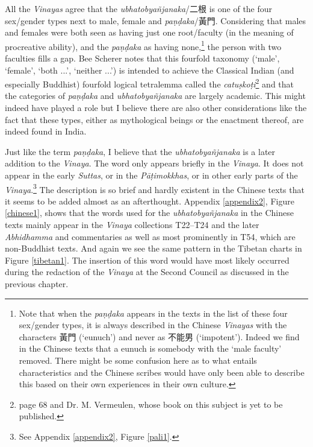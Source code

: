 All the \textit{Vinayas} agree that the \textit{ubhatob­yañ­janaka}/二根 is one of the four sex/gender types next to male, female and \textit{paṇḍaka}/黃門. Considering that males and females were both seen as having just one root/faculty (in the meaning of procreative ability), and the \textit{paṇḍaka} as having none,\footnote{Note that when the \textit{paṇḍaka} appears in the texts in the list of these four sex/gender types, it is always described in the Chinese \textit{Vinayas} with the characters 黃門 (`eunuch') and never as 不能男 (`impotent'). Indeed we find in the Chinese texts that a eunuch is somebody with the `male faculty' removed. There might be some confusion here as to what entails characteristics and the Chinese scribes would have only been able to describe this based on their own experiences in their own culture.} the person with two faculties fills a gap. Bee Scherer notes that this fourfold taxonomy (`male', `female', `both ...', `neither ...') is intended to achieve the Classical Indian (and especially Buddhist) fourfold logical tetralemma called the \textit{catuṣkoṭi}\footnote{\cite{scherer} page 68 and Dr. M. Vermeulen, whose book on this subject is yet to be published.} and that the categories of \textit{paṇḍaka} and \textit{ubhatob­yañ­janaka} are largely academic. This might indeed have played a role but I believe there are also other considerations like the fact that these types, either as mythological beings or the enactment thereof, are indeed found in India.

Just like the term \textit{paṇḍaka}, I believe that the \textit{ubhatob­yañ­janaka} is a later addition to the \textit{Vinaya}. The word only appears briefly in the \textit{Vinaya}. It does not appear in the early \textit{Suttas}, or in the \textit{Pāṭimokkhas}, or in other early parts of the \textit{Vinaya}.\footnote{See Appendix \ref{appendix2}, Figure \ref{pali1}.} The description is so brief and hardly existent in the Chinese texts that it seems to be added almost as an afterthought. Appendix \ref{appendix2}, Figure \ref{chinese1}, shows that the words used for the \textit{ubhatob­yañ­janaka} in the Chinese texts mainly appear in the \textit{Vinaya} collections T22–T24 and the later \textit{Abhidhamma} and commentaries as well as most prominently in T54, which are non-Buddhist texts. And again we see the same pattern in the Tibetan charts in Figure \ref{tibetan1}. The insertion of this word would have most likely occurred during the redaction of the \textit{Vinaya} at the Second Council as discussed in the previous chapter.

